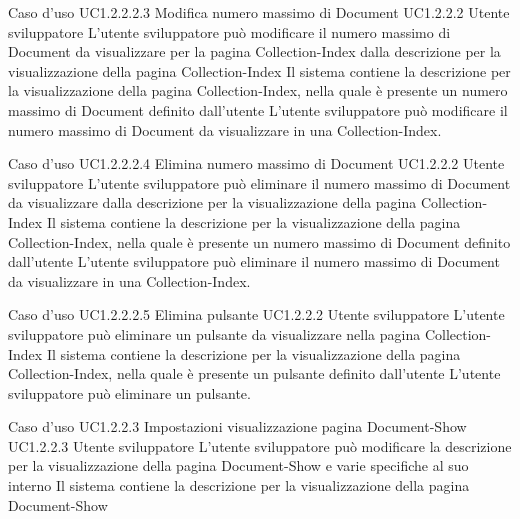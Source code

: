 \UCtitle
{Caso d'uso UC1.2.2.2.3}
{Modifica numero massimo di Document}
\UC
{UC1.2.2.2}
{Utente sviluppatore}
{L'utente sviluppatore  può modificare il numero massimo di Document da visualizzare per la pagina Collection-Index dalla descrizione per la visualizzazione della pagina Collection-Index}
{Il sistema contiene la descrizione per la visualizzazione della pagina Collection-Index, nella quale è presente un numero massimo di Document definito dall'utente}
\scenario
{L'utente sviluppatore può modificare il numero massimo di Document da visualizzare in una Collection-Index.}

\UCtitle
{Caso d'uso UC1.2.2.2.4}
{Elimina numero massimo di Document}
\UC
{UC1.2.2.2}
{Utente sviluppatore}
{L'utente sviluppatore  può eliminare il numero massimo di Document da visualizzare dalla descrizione per la visualizzazione della pagina Collection-Index}
{Il sistema contiene la descrizione per la visualizzazione della pagina Collection-Index, nella quale è presente un numero massimo di Document definito dall'utente}
\scenario
{L'utente sviluppatore può eliminare il numero massimo di Document da visualizzare in una Collection-Index.}

\UCtitle
{Caso d'uso UC1.2.2.2.5}
{Elimina pulsante}
\UC
{UC1.2.2.2}
{Utente sviluppatore}
{L'utente sviluppatore  può eliminare un pulsante da visualizzare nella pagina Collection-Index}
{Il sistema contiene la descrizione per la visualizzazione della pagina Collection-Index, nella quale è presente un pulsante definito dall'utente}
\scenario
{L'utente sviluppatore può eliminare un pulsante.}


\UCtitle
{Caso d'uso UC1.2.2.3}
{Impostazioni visualizzazione pagina Document-Show}
\UC
{UC1.2.2.3}
{Utente sviluppatore}
{L'utente sviluppatore  può modificare la descrizione per la visualizzazione della pagina Document-Show e varie specifiche al suo interno}
{Il sistema contiene la descrizione per la visualizzazione della pagina Document-Show}


